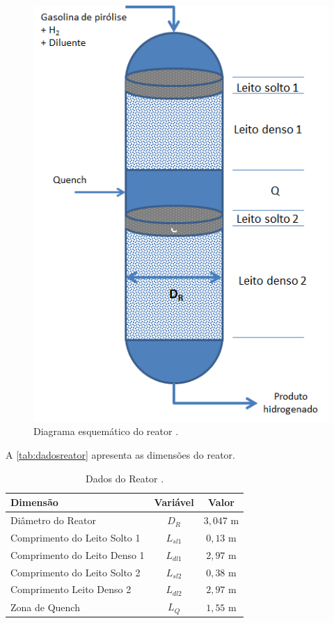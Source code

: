 \begin{figure}[htb]
\centering \includegraphics[scale=0.75]{images/Chap3/esquemareator.png}
\caption{Diagrama esquemático do reator \cite{Rojas2014a}.}
\label{fig:esquemareator}
\end{figure}

A \autoref{tab:dadosreator} apresenta as dimensões do reator.

\begin{table}[!htb]
\begin{center}
\caption{Dados do Reator \cite{Rojas2014a}.}
\label{tab:dadosreator}
\small
\begin{tabular}{lcc}
{Dimensão} & {Variável} & {Valor}
\\
\hline
{Diâmetro do Reator} & {$D_R$} & $3,047$ m \\
{Comprimento do Leito Solto 1} & {$L_{sl1}$} & $0,13$ m \\
{Comprimento do Leito Denso 1} & {$L_{dl1}$} & $2,97$ m \\
{Comprimento do Leito Solto 2} & {$L_{sl2}$} & $0,38$ m \\
{Comprimento Leito Denso 2} & {$L_{dl2}$} & $2,97$ m \\
{Zona de Quench} & {$L_{Q}$} & $1,55$ m \\
\bottomrule
\end{tabular}
\end{center}
\end{table}

